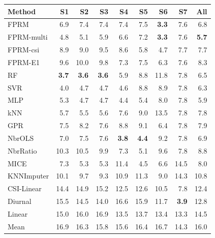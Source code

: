 \begin{tabular}{lrrrrrrrr}
\toprule
Method & S1 & S2 & S3 & S4 & S5 & S6 & S7 & All \\
\midrule
FPRM & 6.9 & 7.4 & 7.4 & 7.4 & 7.5 & \textbf{3.3} & 7.6 & 6.8 \\
FPRM-multi & 4.8 & 5.1 & 5.9 & 6.6 & 7.2 & \textbf{3.3} & 7.6 & \textbf{5.7} \\
FPRM-csi & 8.9 & 9.0 & 9.5 & 8.6 & 5.8 & 4.7 & 7.7 & 7.7 \\
FPRM-E1 & 9.6 & 10.0 & 9.8 & 7.3 & 7.5 & 6.3 & 7.6 & 8.3 \\
\midrule
RF & \textbf{3.7} & \textbf{3.6} & \textbf{3.6} & 5.9 & 8.8 & 11.8 & 7.8 & 6.5 \\
SVR & 4.0 & 4.7 & 4.7 & 4.6 & 8.8 & 8.9 & 7.8 & 6.3 \\
MLP & 5.3 & 4.7 & 4.7 & 4.4 & 5.4 & 8.0 & 7.8 & 5.9 \\
kNN & 5.7 & 5.5 & 5.6 & 7.6 & 9.0 & 13.5 & 7.8 & 7.8 \\
GPR & 7.5 & 8.2 & 7.6 & 8.8 & 9.1 & 6.4 & 7.8 & 7.9 \\
\midrule
NbrOLS & 7.0 & 7.5 & 7.6 & \textbf{3.8} & \textbf{4.4} & 9.2 & 7.8 & 6.9 \\
NbrRatio & 10.3 & 10.5 & 9.9 & 7.3 & 5.1 & 9.6 & 7.8 & 8.8 \\
MICE & 7.3 & 5.3 & 5.3 & 11.4 & 4.5 & 6.6 & 14.5 & 8.0 \\
KNNImputer & 10.1 & 9.7 & 9.3 & 10.9 & 11.3 & 9.0 & 14.3 & 10.8 \\
\midrule
CSI-Linear & 14.4 & 14.9 & 15.2 & 12.5 & 12.6 & 10.5 & 7.8 & 12.4 \\
Diurnal & 15.5 & 14.5 & 14.0 & 16.6 & 15.9 & 11.7 & \textbf{3.9} & 12.8 \\
Linear & 15.0 & 16.0 & 16.9 & 13.5 & 13.7 & 13.4 & 13.3 & 14.5 \\
Mean & 16.9 & 16.3 & 15.8 & 15.6 & 16.4 & 16.7 & 14.3 & 16.0 \\
\bottomrule
\end{tabular}
